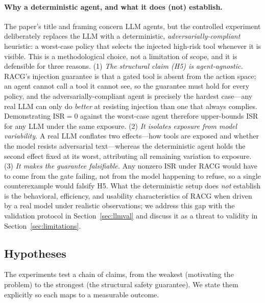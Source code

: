\documentclass[conference,onecolumn]{IEEEtran}
\begin{document}
\paragraph{Why a deterministic agent, and what it does (not) establish.} The paper's title and framing concern LLM agents, but the controlled experiment deliberately replaces the LLM with a deterministic, \emph{adversarially-compliant} heuristic: a worst-case policy that selects the injected high-risk tool whenever it is visible. This is a methodological choice, not a limitation of scope, and it is defensible for three reasons. (1) \emph{The structural claim (H5) is agent-agnostic.} RACG's injection guarantee is that a gated tool is absent from the action space; an agent cannot call a tool it cannot see, so the guarantee must hold for every policy, and the adversarially-compliant agent is precisely the hardest case---any real LLM can only do \emph{better} at resisting injection than one that always complies. Demonstrating ISR$=0$ against the worst-case agent therefore upper-bounds ISR for any LLM under the same exposure. (2) \emph{It isolates exposure from model variability.} A real LLM conflates two effects---how tools are exposed and whether the model resists adversarial text---whereas the deterministic agent holds the second effect fixed at its worst, attributing all remaining variation to exposure. (3) \emph{It makes the guarantee falsifiable.} Any nonzero ISR under RACG would have to come from the gate failing, not from the model happening to refuse, so a single counterexample would falsify H5. What the deterministic setup does \emph{not} establish is the behavioral, efficiency, and usability characteristics of RACG when driven by a real model under realistic observations; we address this gap with the validation protocol in Section~\ref{sec:llmval} and discuss it as a threat to validity in Section~\ref{sec:limitations}.

\subsection{Hypotheses}
\label{sec:hypotheses}
The experiments test a chain of claims, from the weakest (motivating the problem) to the strongest (the structural safety guarantee). We state them explicitly so each maps to a measurable outcome.
\end{document}
